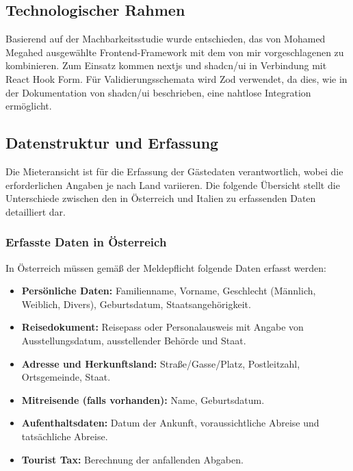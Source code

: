     \subsection{Technologischer Rahmen}
    \label{sec:technoglogischerRahmen}
    Basierend auf der Machbarkeitsstudie wurde entschieden, das von Mohamed Megahed ausgewählte Frontend-Framework mit dem von mir vorgeschlagenen zu kombinieren. Zum Einsatz kommen \gls{nextjs} und shadcn/ui in Verbindung mit React Hook Form. Für Validierungsschemata wird Zod verwendet, da dies, wie in der Dokumentation von shadcn/ui beschrieben, eine nahtlose Integration ermöglicht. \cite{prompt21_pollak}

    \subsection{Datenstruktur und Erfassung}
    Die Mieteransicht ist für die Erfassung der Gästedaten verantwortlich, wobei die erforderlichen Angaben je nach Land variieren. Die folgende Übersicht stellt die Unterschiede zwischen den in Österreich und Italien zu erfassenden Daten detailliert dar.
    
    \subsubsection{Erfasste Daten in Österreich}
    In Österreich müssen gemäß der Meldepflicht folgende Daten erfasst werden:
    \begin{itemize}
        \item \textbf{Persönliche Daten:} Familienname, Vorname, Geschlecht (Männlich, Weiblich, Divers), Geburtsdatum, Staatsangehörigkeit.
        \item \textbf{Reisedokument:} Reisepass oder Personalausweis mit Angabe von Ausstellungsdatum, ausstellender Behörde und Staat.
        \item \textbf{Adresse und Herkunftsland:} Straße/Gasse/Platz, Postleitzahl, Ortsgemeinde, Staat.
        \item \textbf{Mitreisende (falls vorhanden):} Name, Geburtsdatum.
        \item \textbf{Aufenthaltsdaten:} Datum der Ankunft, voraussichtliche Abreise und tatsächliche Abreise.
        \item \textbf{Tourist Tax:} Berechnung der anfallenden Abgaben.
    \end{itemize}
    

